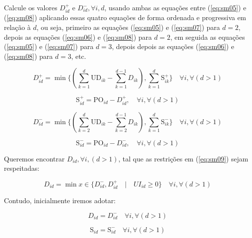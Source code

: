 \documentclass[authoryear,preprint,12pt]{elsarticle}
\begin{document}
Calcule os valores $D_{id}^+$ e $D_{id}^-, \forall i, d$, usando ambas as equações entre (\ref{eq:sm05}) e (\ref{eq:sm08}) aplicando essas quatro equações de forma ordenada e progressiva em relação à $d$, ou seja, primeiro as equações (\ref{eq:sm05}) e (\ref{eq:sm07})  para $d = 2$, depois as equações (\ref{eq:sm06}) e (\ref{eq:sm08}) para $d = 2$, em seguida as equações (\ref{eq:sm05}) e (\ref{eq:sm07}) para $d=3$, depois depois as equações (\ref{eq:sm06}) e (\ref{eq:sm08}) para $d = 3$, etc.

\begin{equation}
\label{eq:sm05}
D_{id}^+ =  \min\{(\sum_{k=1}^{d}{\textrm{UD}_{ik}} - \sum_{k=1}^{d-1}{D_{ik}}), \sum_{k=1}^{d}{\textrm{S}_{ik}^+}\}  \quad \forall i, \forall (d>1)
\end{equation}

\begin{equation}
\label{eq:sm06}
\textrm{S}_{id}^+ = \textrm{PO}_{id} - D_{id}^+, \quad \forall i, \forall (d>1)
\end{equation}

\begin{equation}
\label{eq:sm07}
D_{id}^- =  \min\{(\sum_{k=2}^{d}{\textrm{UD}_{ik}} - \sum_{k=2}^{d-1}{D_{ik}}), \sum_{k=1}^{d}{\textrm{S}_{ik}^-}\}  \quad \forall i, \forall (d>1)
\end{equation}

\begin{equation}
\label{eq:sm08}
\textrm{S}_{id}^- = \textrm{PO}_{id} - D_{id}^-, \quad \forall i, \forall (d>1)
\end{equation}

Queremos encontrar $D_{id}, \forall i,(d>1)$, tal que as restrições em (\ref{eq:sm09}) sejam respeitadas:

\begin{equation}
\label{eq:sm09}
D_{id} = \min {x \in \{D_{id}^-, D_{id}^+ \quad | \quad UI_{id} \geq 0\}} \quad \forall i, \forall (d>1)
\end{equation}

Contudo, inicialmente iremos adotar:

\begin{equation}
\label{eq:sm10}
D_{id} = D_{id}^- \quad \forall i, \forall (d>1)
\end{equation}

\begin{equation}
\label{eq:sm10}
\textrm{S}_{id} = \textrm{S}_{id}^- \quad \forall i, \forall (d>1)
\end{equation}
\end{document}
